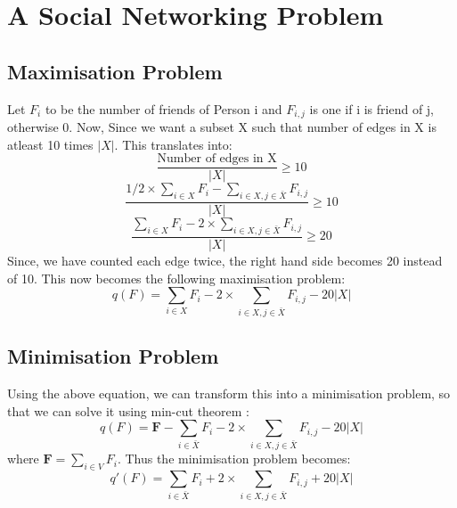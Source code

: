 \documentclass{article}
\begin{document}
\section{A Social Networking Problem}

\subsection{Maximisation Problem}
Let $F_i$ to be the number of friends of Person i and $F_{i,j}$ is one if i is friend of j, otherwise 0. Now, Since we want a subset X such that number of edges in X is atleast 10 times $|X|$. This translates into:
$$ \frac{\text{Number of edges in X}}{|X|} \geq 10$$
$$ \frac{1/2 \times \sum_{i \in X}F_i - \sum_{i \in X, j \in \bar{X}}F_{i,j}}{|X|} \geq 10$$
$$ \frac{\sum_{i \in X}F_i - 2 \times \sum_{i \in X, j \in \bar{X}}F_{i,j}}{|X|} \geq 20$$
Since, we have counted each edge twice, the right hand side becomes 20 instead of 10. This now becomes the following maximisation problem:
$$ q(F) = \sum_{i \in X}F_i - 2 \times \sum_{i \in X, j \in \bar{X}}F_{i,j} - 20|X| $$

\subsection{Minimisation Problem}
Using the above equation, we can transform this into a minimisation problem, so that we can solve it using min-cut theorem :
$$ q(F) =  \textbf{F} - \sum_{i \in \bar{X}}F_i - 2 \times \sum_{i \in X, j \in \bar{X}}F_{i,j} - 20|X| $$
where $\textbf{F} = \sum_{i \in V}F_i$. Thus the minimisation problem becomes:
$$ q'(F) =  \sum_{i \in \bar{X}}F_i + 2 \times \sum_{i \in X, j \in \bar{X}}F_{i,j} + 20|X| $$
\end{document}

